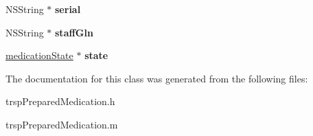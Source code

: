 \begin{DoxyCompactItemize}
\item 
\hypertarget{interfacetrsp_prepared_medication_a78c9c3e602508a17227e7990521a407a}{}N\+S\+String $\ast$ {\bfseries serial}\label{interfacetrsp_prepared_medication_a78c9c3e602508a17227e7990521a407a}

\item 
\hypertarget{interfacetrsp_prepared_medication_a20f4900eefb9b5ead219e05968a35d10}{}N\+S\+String $\ast$ {\bfseries staff\+Gln}\label{interfacetrsp_prepared_medication_a20f4900eefb9b5ead219e05968a35d10}

\item 
\hypertarget{interfacetrsp_prepared_medication_aca87bdfdc16d797a7da1fa9501197992}{}\hyperlink{interfacemedication_state}{medication\+State} $\ast$ {\bfseries state}\label{interfacetrsp_prepared_medication_aca87bdfdc16d797a7da1fa9501197992}

\end{DoxyCompactItemize}


The documentation for this class was generated from the following files\+:\begin{DoxyCompactItemize}
\item 
trsp\+Prepared\+Medication.\+h\item 
trsp\+Prepared\+Medication.\+m\end{DoxyCompactItemize}
